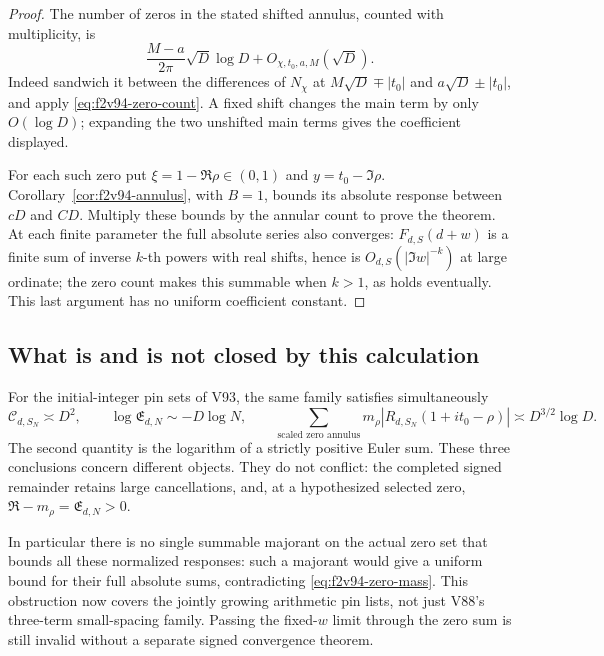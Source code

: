\documentclass[11pt]{article}
\theoremstyle{definition}
\theoremstyle{remark}
\begin{document}
\begin{proof}
The number of zeros in the stated shifted annulus, counted with
multiplicity, is
\[
 \frac{M-a}{2\pi}\sqrt D\log D+O_{\chi,t_0,a,M}(\sqrt D).
\]
Indeed sandwich it between the differences of \(N_\chi\) at
\(M\sqrt D\mp|t_0|\) and \(a\sqrt D\pm|t_0|\), and apply
\eqref{eq:f2v94-zero-count}.  A fixed shift changes the main term by
only \(O(\log D)\); expanding the two unshifted main terms gives
the coefficient displayed.

For each such zero put \(\xi=1-\Re\rho\in(0,1)\) and
\(y=t_0-\Im\rho\).  Corollary~\ref{cor:f2v94-annulus}, with
\(B=1\), bounds its absolute response between \(cD\) and \(CD\).
Multiply these bounds by the annular count to prove the theorem.
At each finite parameter the full absolute series also converges:
\(F_{d,S}(d+w)\) is a finite sum of inverse \(k\)-th powers
with real shifts, hence is \(O_{d,S}(|\Im w|^{-k})\) at large
ordinate; the zero count makes this summable when \(k>1\), as holds
eventually.  This last argument has no uniform coefficient constant.
\end{proof}

\subsection{What is and is not closed by this calculation}

For the initial-integer pin sets of V93, the same family satisfies
simultaneously
\begin{equation}
 \mathcal C_{d,S_N}\asymp D^2,\qquad
 \log\mathfrak E_{d,N}\sim-D\log N,\qquad
 \sum_{\text{scaled zero annulus}}m_\rho|R_{d,S_N}(1+it_0-\rho)|
       \asymp D^{3/2}\log D.
 \label{eq:f2v94-comparison}
\end{equation}
The second quantity is the logarithm of a strictly positive Euler sum.
These three conclusions concern different objects.  They do not
conflict: the completed signed remainder retains large cancellations,
and, at a hypothesized selected zero,
\(\mathfrak R-m_\rho=\mathfrak E_{d,N}>0\).

In particular there is no single summable majorant on the actual zero
set that bounds all these normalized responses: such a majorant would
give a uniform bound for their full absolute sums, contradicting
\eqref{eq:f2v94-zero-mass}.  This obstruction now covers the jointly
growing arithmetic pin lists, not just V88's three-term small-spacing
family.  Passing the fixed-\(w\) limit through the zero sum is still
invalid without a separate signed convergence theorem.
\end{document}
